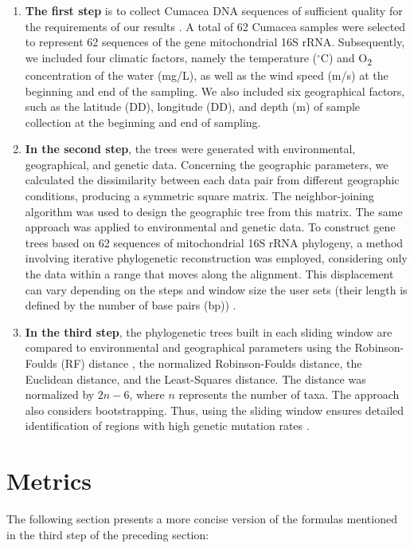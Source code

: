 \begin{enumerate}
\item \textbf{The first step} is to collect Cumacea DNA sequences of sufficient quality for the requirements of our results \citep{koshkarov_phylogeography_2022}. A total of 62 Cumacea samples were selected to represent 62 sequences of the gene mitochondrial 16S rRNA. Subsequently, we included four climatic factors, namely the temperature ($^\circ$C) and O\textsubscript{2} concentration of the water (mg/L), as well as the wind speed (m/s) at the beginning and end of the sampling. We also included six geographical factors, such as the latitude (DD), longitude (DD), and depth (m) of sample collection at the beginning and end of sampling.

\item \textbf{In the second step}, the trees were generated with environmental, geographical, and genetic data. Concerning the geographic parameters, we calculated the dissimilarity between each data pair from different geographic conditions, producing a symmetric square matrix. The neighbor-joining algorithm was used to design the geographic tree from this matrix. The same approach was applied to environmental and genetic data. To construct gene trees based on 62 sequences of mitochondrial 16S rRNA phylogeny, a method involving iterative phylogenetic reconstruction was employed, considering only the data within a range that moves along the alignment. This displacement can vary depending on the steps and window size the user sets (their length is defined by the number of base pairs (bp)) \citep{koshkarov_phylogeography_2022}.

\item \textbf{In the third step}, the phylogenetic trees built in each sliding window are compared to environmental and geographical parameters using the Robinson-Foulds (RF) distance \citep{robinson_comparison_1981, koshkarov_phylogeography_2022}, the normalized Robinson-Foulds distance, the Euclidean distance, and the Least-Squares distance. The distance was normalized by $2n-6$, where $n$ represents the number of taxa. The approach also considers bootstrapping. Thus, using the sliding window ensures detailed identification of regions with high genetic mutation rates \citep{koshkarov_phylogeography_2022}.
\end{enumerate}

\section{Metrics}\label{metrics}
The following section presents a more concise version of the formulas mentioned in the third step of the preceding section:

